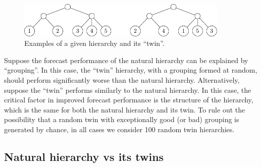 \documentclass[a4paper,review,12pt,authoryear]{elsarticle}
\begin{document}
\begin{figure}[h!]
    \centering
    \includegraphics[width=0.9\textwidth]{../manuscript/figures/aggcluster_random.pdf}
\caption{\label{fig:aggcluster_random}Examples of a given hierarchy and its ``twin''. }
\end{figure}

Suppose the forecast performance of the natural hierarchy can be explained by ``grouping''. In this case, the ``twin'' hierarchy, with a grouping formed at random, should perform significantly worse than the natural hierarchy. Alternatively, suppose the ``twin'' performs similarly to the natural hierarchy. In this case, the critical factor in improved forecast performance is the structure of the hierarchy, which is the same for both the natural hierarchy and its twin. To rule out the possibility that a random twin with exceptionally good (or bad) grouping is generated by chance, in all cases we consider 100 random twin hierarchies.





\subsection{Natural hierarchy vs its twins}
\end{document}
